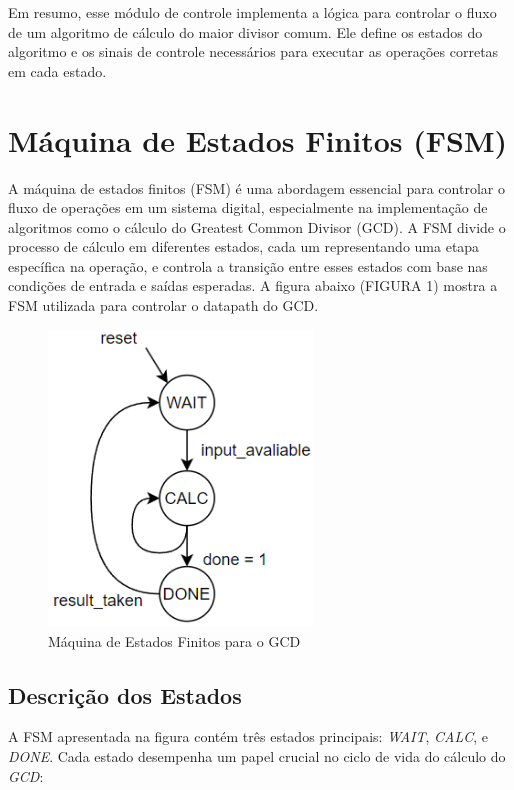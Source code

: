 \documentclass[a4paper,11pt]{article} %
\begin{document}
Em resumo, esse módulo de controle implementa a lógica para controlar o fluxo de um algoritmo de cálculo do maior divisor comum. Ele define os estados do algoritmo e os sinais de controle necessários para executar as operações corretas em cada estado.

\section{Máquina de Estados Finitos (FSM)}
A máquina de estados finitos (FSM) é uma abordagem essencial
para controlar o fluxo de operações em um sistema digital,
especialmente na implementação de algoritmos como o cálculo
do Greatest Common Divisor (GCD). A FSM divide o processo
de cálculo em diferentes estados, cada um representando uma
etapa específica na operação, e controla a transição entre
esses estados com base nas condições de entrada e saídas
esperadas. A figura abaixo (FIGURA 1) mostra a FSM utilizada para controlar
o datapath do GCD.

\begin{figure}[ht]
    \centering
    \includegraphics[width=7cm,angle=0]{imgs/state_machine_GCD.png}
    \caption{Máquina de Estados Finitos para o GCD}
    \label{fig:fsm}
\end{figure}

\subsection{Descrição dos Estados}
A FSM apresentada na figura contém três estados principais:
\textit{WAIT}, \textit{CALC}, e \textit{DONE}. Cada estado desempenha um papel crucial
no ciclo de vida do cálculo do \textit{GCD}:
\end{document}
